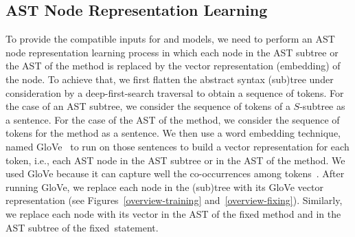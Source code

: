 \subsection{AST Node Representation Learning}

To provide the compatible inputs for  and  models,
we need to perform an AST node representation learning process in
which each node in the AST subtree or the AST of the method is
replaced by the vector representation (embedding) of the node. To
achieve that, we first flatten the abstract syntax (sub)tree under
consideration by a deep-first-search traversal to obtain a sequence of
tokens. For the case of an AST subtree, we consider the sequence of
tokens of a $S$-subtree as a sentence. For the case of the AST of the
method, we consider the sequence of tokens for the method as a
sentence. We then use a word embedding technique, named
GloVe~\cite{pennington2014glove} to run on those sentences to build a
vector representation for each token, i.e., each AST node in the AST
subtree or in the AST of the method. We used GloVe because it can
capture well the co-occurrences among
tokens~\cite{pennington2014glove}. After running GloVe, we replace
each node in the (sub)tree with its GloVe vector representation (see
Figures~\ref{overview-training} and~\ref{overview-fixing}). Similarly,
we replace each node with its vector in the AST of the fixed method
and in the AST subtree of the fixed~statement.


